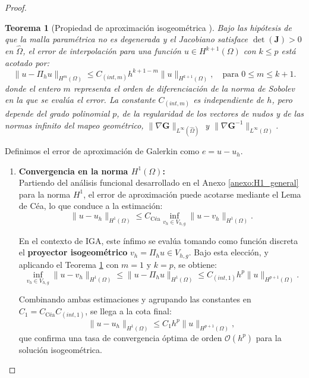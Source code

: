 \documentclass[11pt]{book}
\theoremstyle{plain} %
\newtheorem{teorema}{Teorema}[chapter]
\theoremstyle{definition} %
\theoremstyle{definition} %
\begin{document}
\begin{proof}
    \begin{teorema}[Propiedad de aproximación isogeométrica \cite{bazilevs_isogeometric_2010}]
    \label{teor:aprox_iga}
    Bajo las hipótesis de que la malla paramétrica no es degenerada y el Jacobiano satisface $\det(\mathbf{J}) > 0$ en $\hat{\Omega}$, el error de interpolación para una función $u \in H^{k+1}(\Omega)$ con $k \leq p$ está acotado por:
    $$ \| u - \Pi_h u \|_{H^m(\Omega)} \leq C_{(int, m)} h^{k+1-m} \| u \|_{H^{k+1}(\Omega)}, \quad \text{para } 0 \leq m \leq k+1. $$
    donde el entero $m$ representa el orden de diferenciación de la norma de Sobolev en la que se evalúa el error. La constante $C_{(int, m)}$ es independiente de $h$, pero depende del grado polinomial $p$, de la regularidad de los vectores de nudos y de las normas infinito del mapeo geométrico, $\|\nabla \mathbf{G}\|_{L^\infty(\hat{\Omega})}$ y $\|\nabla \mathbf{G}^{-1}\|_{L^\infty(\Omega)}$.
    \end{teorema}
    Definimos el error de aproximación de Galerkin como $e = u - u_h$.

    \begin{enumerate}
        \item \textbf{Convergencia en la norma $H^1(\Omega)$:} \\
        Partiendo del análisis funcional desarrollado en el Anexo \ref{anexo:H1_general} para la norma $H^1$, el error de aproximación puede acotarse mediante el Lema de Céa, lo que conduce a la estimación:
        \begin{equation*}
            \|u - u_h\|_{H^1(\Omega)} \leq C_{\text{Céa}} \inf_{v_h \in V_{h,g}} \|u - v_h\|_{H^1(\Omega)}.
        \end{equation*}

        En el contexto de IGA, este ínfimo se evalúa tomando como función discreta el \textbf{proyector isogeométrico} $v_h = \Pi_h u \in V_{h,g}$. Bajo esta elección, y aplicando el Teorema \ref{teor:aprox_iga} con $m=1$ y $k=p$, se obtiene:
        \begin{equation*}
            \inf_{v_h \in V_{h,g}} \|u - v_h\|_{H^1(\Omega)} \leq \| u - \Pi_h u \|_{H^1(\Omega)} \leq C_{(int, 1)} h^p \| u \|_{H^{p+1}(\Omega)}.
        \end{equation*}

        \noindent Combinando ambas estimaciones y agrupando las constantes en $C_{1} = C_{\text{Céa}} C_{(int, 1)}$, se llega a la cota final:
        \begin{equation*}
            \| u - u_h \|_{H^1(\Omega)} \leq C_{1} h^p \| u \|_{H^{p+1}(\Omega)},
        \end{equation*}
        que confirma una tasa de convergencia óptima de orden $\mathcal{O}(h^p)$ para la solución isogeométrica.


\end{enumerate}
\end{proof}
\end{document}
